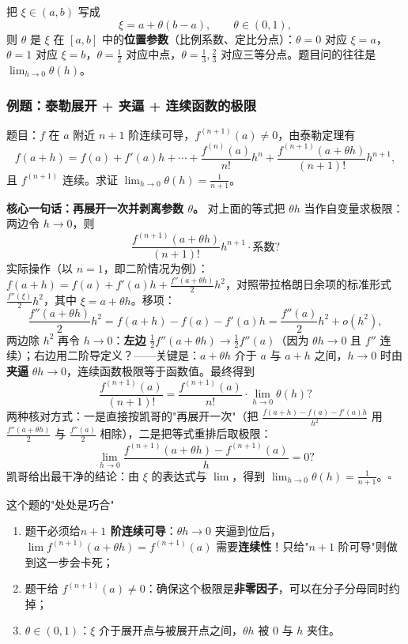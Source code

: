 \documentclass[a4paper]{article}
\begin{document}
把 $\xi\in(a,b)$ 写成
\[
\xi=a+\theta(b-a),\qquad \theta\in(0,1),
\]
则 $\theta$ 是 $\xi$ 在 $[a,b]$ 中的\textbf{位置参数}（比例系数、定比分点）：$\theta=0$ 对应 $\xi=a$，$\theta=1$ 对应 $\xi=b$，$\theta=\frac12$ 对应中点，$\theta=\frac13,\frac23$ 对应三等分点。题目问的往往是 $\lim_{h\to0}\theta(h)$。

\subsubsection{例题：泰勒展开 + 夹逼 + 连续函数的极限}

题目：$f$ 在 $a$ 附近 $n+1$ 阶连续可导，$f^{(n+1)}(a)\neq0$，由泰勒定理有
\[
f(a+h)=f(a)+f'(a)h+\cdots+\frac{f^{(n)}(a)}{n!}h^n+\frac{f^{(n+1)}(a+\theta h)}{(n+1)!}h^{n+1},
\]
且 $f^{(n+1)}$ 连续。求证 $\lim_{h\to0}\theta(h)=\frac{1}{n+1}$。

\textbf{核心一句话：再展开一次并剥离参数 $\theta$。} 对上面的等式把 $\theta h$ 当作自变量求极限：两边令 $h\to0$，则
\[
\frac{f^{(n+1)}(a+\theta h)}{(n+1)!}h^{n+1}\cdot \text{系数}?
\]
实际操作（以 $n=1$，即二阶情况为例）：$f(a+h)=f(a)+f'(a)h+\frac{f''(a+\theta h)}2h^2$，对照带拉格朗日余项的标准形式 $\frac{f''(\xi)}2h^2$，其中 $\xi=a+\theta h$。移项：
\[
\frac{f''(a+\theta h)}2h^2=f(a+h)-f(a)-f'(a)h=\frac{f''(a)}2h^2+o(h^2),
\]
两边除 $h^2$ 再令 $h\to0$：\textbf{左边} $\frac12 f''(a+\theta h)\to\frac12 f''(a)$（因为 $\theta h\to0$ 且 $f''$ 连续）；右边用二阶导定义？——关键是：$a+\theta h$ 介于 $a$ 与 $a+h$ 之间，$h\to0$ 时由\textbf{夹逼} $\theta h\to0$，连续函数极限等于函数值。最终得到
\[
\frac{f^{(n+1)}(a)}{(n+1)!}=\frac{f^{(n+1)}(a)}{n!}\cdot\lim_{h\to0}\theta(h)?
\]
两种核对方式：一是直接按凯哥的"再展开一次"（把 $\frac{f(a+h)-f(a)-f'(a)h}{h^2}$ 用 $\frac{f''(a+\theta h)}2$ 与 $\frac{f''(a)}2$ 相除），二是把等式重排后取极限：
\[
\lim_{h\to0}\frac{f^{(n+1)}(a+\theta h)-f^{(n+1)}(a)}{h}=0?
\]
凯哥给出最干净的结论：由 $\xi$ 的表达式与 $\lim$，得到 $\lim_{h\to0}\theta(h)=\frac1{n+1}$。$\square$

\begin{knowledgebox}{这个题的"处处是巧合"}
\begin{enumerate}
\item 题干必须给\textbf{$n+1$ 阶连续可导}：$\theta h\to0$ 夹逼到位后，$\lim f^{(n+1)}(a+\theta h)=f^{(n+1)}(a)$ 需要\textbf{连续性}！只给"$n+1$ 阶可导"则做到这一步会卡死；
\item 题干给 $f^{(n+1)}(a)\neq0$：确保这个极限是\textbf{非零因子}，可以在分子分母同时约掉；
\item $\theta\in(0,1)$：$\xi$ 介于展开点与被展开点之间，$\theta h$ 被 $0$ 与 $h$ 夹住。
\end{enumerate}
\end{knowledgebox}
\end{document}
